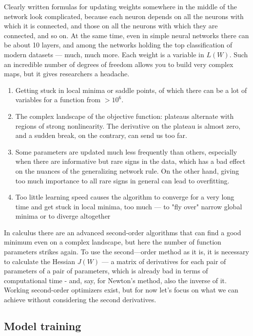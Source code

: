 Clearly written formulas for updating weights somewhere in the middle of the network look complicated, because each neuron depends on all the neurons with which it is connected, and those on all the neurons with which they are connected, and so on. At the same time, even in simple neural networks there can be about 10 layers, and among the networks holding the top classification of modern datasets — much, much more. Each weight is a variable in $L(W)$. Such an incredible number of degrees of freedom allows you to build very complex maps, but it gives researchers a headache.

\begin{enumerate}
    \item Getting stuck in local minima or saddle points, of which there can be a lot of variables for a function from $>10^6$.
    \item The complex landscape of the objective function: plateaus alternate with regions of strong nonlinearity. The derivative on the plateau is almost zero, and a sudden break, on the contrary, can send us too far.
    \item Some parameters are updated much less frequently than others, especially when there are informative but rare signs in the data, which has a bad effect on the nuances of the generalizing network rule. On the other hand, giving too much importance to all rare signs in general can lead to overfitting.
    \item Too little learning speed causes the algorithm to converge for a very long time and get stuck in local minima, too much — to "fly over" narrow global minima or to diverge altogether
\end{enumerate}

In calculus there are an advanced second-order algorithms that can find a good minimum even on a complex landscape, but here the number of function parameters strikes again. To use the second—order method as it is, it is necessary to calculate the Hessian $J(W)$ — a matrix of derivatives for each pair of parameters of a pair of parameters, which is already bad in terms of computational time - and, say, for Newton's method, also the inverse of it. Working second-order optimizers exist, but for now let's focus on what we can achieve without considering the second derivatives.

\subsection{Model training}

